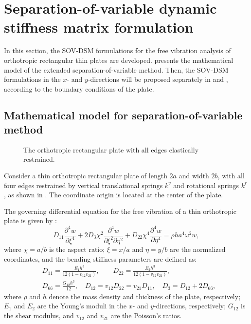 \documentclass[preprint,12pt,number]{elsarticle}
\begin{document}
\FloatBarrier
\section{Separation-of-variable dynamic stiffness matrix formulation}\label{sec:SOV-DSM}
In this section, the SOV-DSM formulations for the free vibration analysis of orthotropic rectangular thin plates are developed.  
 presents the mathematical model of the extended separation-of-variable method.  
Then, the SOV-DSM formulations in the $x$- and $y$-directions will be proposed separately in  and , according to the boundary conditions of the plate.

\subsection{Mathematical model for separation-of-variable method}\label{sec:Mathematical model}
\begin{figure}[!htbp]
\centering
\resizebox{0.8\textwidth}{!}
{
	
}
\caption{\small The orthotropic rectangular plate with all edges elastically restrained.} 
\label{fig:platemode}
\end{figure}
Consider a thin orthotropic rectangular plate of length $2a$ and width $2b$, with all four edges restrained by vertical translational springs $k^v$ and rotational springs $k^r$, as shown in . 
The coordinate origin is located at the center of the plate.

The governing differential equation for the free vibration of a thin orthotropic plate is given by \citep{xing2020improved}:  
%
\begin{equation}\label{eq:governing_EOM}
D_{11}\frac{\partial^4w}{\partial \xi^4} + 2D_3\chi^2\frac{\partial^4w}{\partial \xi^2 \partial \eta^2} + D_{22}\chi^4\frac{\partial^4w}{\partial \eta^4} = \rho ha^4\omega^2w,
\end{equation}
%
where $ \chi = a / b $ is the aspect ratio; $ \xi = x / a $ and $ \eta = y / b $ are the normalized coordinates, and the bending stiffness parameters are defined as:
%
\begin{equation}\label{eq:bd_stiff}
\begin{split}
	&D_{11} = \frac{E_1h^3}{12(1-v_{12}v_{21})}, \qquad D_{22} = \frac{E_2h^3}{12(1-v_{12}v_{21})}, \\  
	&D_{66} = \frac{G_{12}h^3}{12}, \quad D_{12} = v_{12}D_{22} = v_{21}D_{11}, \quad D_3 = D_{12} + 2D_{66},
\end{split}
\end{equation}
%
where $\rho$ and $h$ denote the mass density and thickness of the plate, respectively; $E_1$ and $E_2$ are the Young’s moduli in the $x$- and $y$-directions, respectively; $G_{12}$ is the shear modulus, and $v_{12}$ and $v_{21}$ are the Poisson’s ratios.
\end{document}
